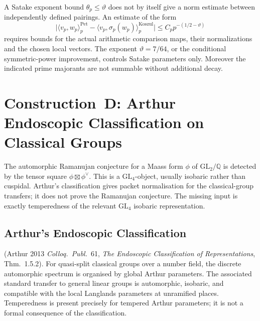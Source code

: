 \begin{remark}
\label{v4-arith:w10-c:cor:Maass-residual-sharpened}
A Satake exponent bound \(\theta_p\leq\vartheta\) does not by
itself give a norm estimate between independently defined pairings.
An estimate of the form
\begin{equation}
\label{v4-arith:w10-c:eq:maass-residual-sharpened}
\bigl|\langle v_p,w_p\rangle^{\mathrm{Pet}}_p
-\langle v_p,\sigma_p(w_p)\rangle^{\mathrm{Koszul}}_p\bigr|
\leq C_p p^{-(1/2-\vartheta)}
\end{equation}
requires bounds for the actual arithmetic comparison maps, their
normalizations and the chosen local vectors. The exponent
\(\vartheta=7/64\), or the conditional symmetric-power improvement,
controls Satake parameters only. Moreover the indicated prime
majorants are not summable without additional decay.
\end{remark}

\section{Construction~D: Arthur Endoscopic Classification on Classical Groups}
\label{v4-arith:w10-c:construction-D}

The automorphic Ramanujan conjecture for a Maass form
\(\phi\) of \(\mathrm{GL}_{2}/\mathbb{Q}\) is detected by the tensor square
\(\phi\boxtimes\phi^{\vee}\). This is a \(\mathrm{GL}_{4}\)-object, usually
isobaric rather than cuspidal. Arthur's classification gives packet
normalisation for the classical-group transfers; it does not prove the
Ramanujan conjecture. The missing input is exactly temperedness of the
relevant \(\mathrm{GL}_{4}\) isobaric representation.

\subsection{Arthur's Endoscopic Classification}
\label{v4-arith:w10-c:construction-D:arthur}

\begin{theorem}
\label{v4-arith:w10-c:thm:arthur-2013}
\ClaimStatusProvedElsewhere (Arthur 2013
\emph{Colloq.~Publ.}~61, \emph{The Endoscopic Classification of
Representations}, Thm.~1.5.2). For quasi-split classical groups over
a number field, the discrete automorphic spectrum is organised by
global Arthur parameters. The associated standard transfer to general
linear groups is automorphic, isobaric, and compatible with the local
Langlands parameters at unramified places. Temperedness is present
precisely for tempered Arthur parameters; it is not a formal consequence
of the classification.
\end{theorem}

